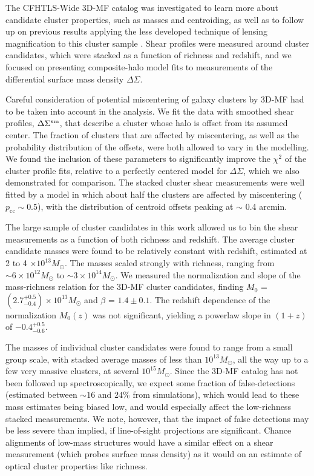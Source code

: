 The \ac{CFHTLS}-Wide \ac{3D-MF} catalog was investigated to learn more about candidate cluster properties, such as masses and centroiding, as well as to follow up on previous results applying the less developed technique of lensing magnification to this cluster sample \citep{Ford14}. Shear profiles were measured around cluster candidates, which were stacked as a function of richness and redshift, and we focused on presenting composite-halo model fits to measurements of the differential surface mass density $\Delta\Sigma$. 

Careful consideration of potential miscentering of galaxy clusters by \ac{3D-MF} had to be taken into account in the analysis. We fit the data with smoothed shear profiles, $\Delta\Sigma^{\rm sm}$, that describe a cluster whose halo is offset from its assumed center. The fraction of clusters that are affected by miscentering, as well as the probability distribution of the offsets, were both allowed to vary in the modelling. We found the inclusion of these parameters to significantly improve the $\chi^2$ of the cluster profile fits, relative to a perfectly centered model for $\Delta\Sigma$, which we also demonstrated for comparison. The stacked cluster shear measurements were well fitted by a model in which about half the clusters are affected by miscentering ($p_{\mathrm{cc}} \sim 0.5$), with the distribution of centroid offsets peaking at $\sim$ 0.4 arcmin.

The large sample of cluster candidates in this work allowed us to bin the shear measurements as a function of both richness and redshift. The average cluster candidate masses were found to be relatively constant with redshift, estimated at 2 to 4 $\times 10^{13} M_{\odot}$. The masses scaled strongly with richness, ranging from $\sim 6 \times 10^{12} M_{\odot}$ to $\sim 3 \times 10^{14} M_{\odot}$. We measured the normalization and slope of the mass-richness relation for the \ac{3D-MF} cluster candidates, finding $M_0$ = $(2.7^{+0.5}_{-0.4}) \times 10^{13} M_{\odot}$ and $\beta$ = $1.4 \pm 0.1$. The redshift dependence of the normalization $M_0 (z)$ was not significant, yielding a powerlaw slope in $(1+z)$ of $-0.4^{+0.5}_{-0.6}$. 

The masses of individual cluster candidates were found to range from a small group scale, with stacked average masses of less than $10^{13} M_{\odot}$, all the way up to a few very massive clusters, at several $10^{15} M_{\odot}$. Since the \ac{3D-MF} catalog has not been followed up spectroscopically, we expect some fraction of false-detections (estimated between $\sim 16$ and $24$\% from simulations), which would lead to these mass estimates being biased low, and would especially affect the low-richness stacked measurements. We note, however, that the impact of false detections may be less severe than implied, if line-of-sight projections are significant. Chance alignments of low-mass structures would have a similar effect on a shear measurement (which probes surface mass density) as it would on an estimate of optical cluster properties like richness.

